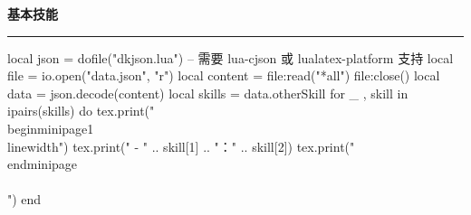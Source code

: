 \documentclass[10pt, a4paper, oneside]{ctexart}
\begin{document}
\ifdefined\otherSkill
\begin{minipage}{1\textwidth}
    \large{\textbf{基本技能}}
\end{minipage}
\rule{\linewidth}{\lineSize}
\begin{center}
    \begin{minipage}{0.9\textwidth}
        \begin{luacode}
            local json = dofile("dkjson.lua")  -- 需要 lua-cjson 或 lualatex-platform 支持
            local file = io.open("data.json", "r")
            local content = file:read("*all")
            file:close()
            local data = json.decode(content)
            local skills = data.otherSkill
            for _ , skill in ipairs(skills) do
                tex.print("\\begin{minipage}{1\\linewidth}")
                tex.print(" - " .. skill[1] .. "：" .. skill[2])
                tex.print("\\end{minipage}\\\\[0.5em]")
            end
        \end{luacode}
    \end{minipage}
\end{center}
\fi
\end{document}
